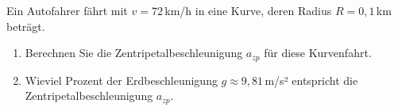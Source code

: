 \begin{ExerciseBlock}
Ein Autofahrer fährt mit $v=72 \,$km/h in eine Kurve, deren Radius $R= 0,1 \,$km beträgt.

\begin{enumerate}
	\item Berechnen Sie die Zentripetalbeschleunigung $a_{zp}$ für diese Kurvenfahrt.

	\item Wieviel Prozent der Erdbeschleunigung $g \approx 9,81 \,$m/s² entspricht die Zentripetalbeschleunigung $a_{zp}$.

\end{enumerate}
\end{ExerciseBlock}
